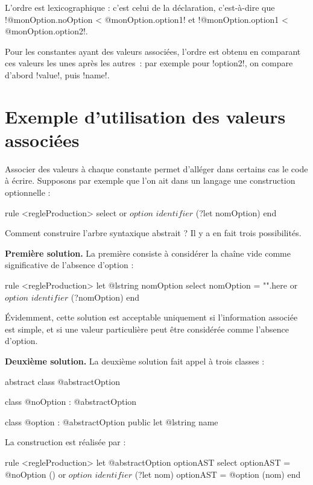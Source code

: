 L'ordre est lexicographique : c'est celui de la déclaration, c'est-à-dire que \ggsq!@monOption.noOption < @monOption.option1! et \ggsq!@monOption.option1 < @monOption.option2!.

Pour les constantes ayant des valeurs associées, l'ordre est obtenu en comparant ces valeurs les unes après les autres~: par exemple pour \ggsq!option2!, on compare d'abord \ggsq!value!, puis \ggsq!name!.









\section{Exemple d'utilisation des valeurs associées}

Associer des valeurs à chaque constante permet d'alléger dans certains cas le code à écrire. Supposons par exemple que l'on ait dans un langage une construction optionnelle :

\begin{galgas4}
rule <regleProduction> {
  select
  or
    $option$
    $identifier$ (?let nomOption)
  end
}
\end{galgas4}

Comment construire l'arbre syntaxique abstrait ? Il y a en fait trois possibilités.

\textbf{Première solution.} La première consiste à considérer la chaîne vide comme significative de l'absence d'option :
\begin{galgas4}
rule <regleProduction> {
  let @lstring nomOption
  select
    nomOption = "".here
  or
    $option$
    $identifier$ (?nomOption)
  end
}
\end{galgas4}

Évidemment, cette solution est acceptable uniquement si l'information associée est simple, et si une valeur particulière peut être considérée comme l'absence d'option.

\textbf{Deuxième solution.} La deuxième solution fait appel à trois classes :
\begin{galgas4}
abstract class @abstractOption {}

class @noOption : @abstractOption {}

class @option : @abstractOption { public let @lstring name }
\end{galgas4}

La construction est réalisée par :
\begin{galgas4}
rule <regleProduction> {
  let @abstractOption optionAST
  select
    optionAST = @noOption ()
  or
    $option$
    $identifier$ (?let nom)
    optionAST = @option (nom)
  end
}
\end{galgas4}

